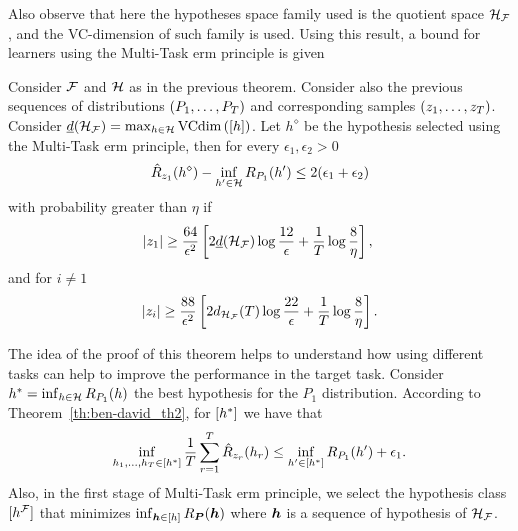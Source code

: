 Also observe that here the hypotheses space family used is the quotient space $\mathcal{H}_{\mathcal{F}}$, and the VC-dimension of such family is used.
%
Using this result, a bound for learners using the Multi-Task \acrshort{erm} principle is given~\cite[Theorem~3]{Ben-DavidB08}
\begin{theorem}\label{th:ben-david_th3}
    Consider $\mathcal{F}$ and $\mathcal{H}$ as in the previous theorem. Consider also the previous sequences of distributions $(P_1, \ldots, P_T)$ and corresponding samples $(z_1, \ldots, z_T)$. Consider $\underline{d}(\mathcal{H}_{\mathcal{F}}) = \max_{h \in \mathcal{H}} \text{VCdim}\left(\lbrack h\rbrack\right)$.
    Let $h^\diamond$ be the hypothesis selected using the Multi-Task \acrshort{erm} principle, then for every $\epsilon_1, \epsilon_2 > 0$
    \begin{equation}
        \nonumber
        {\hat{R}_{z_1}(h^\diamond) - \inf_{h' \in \mathcal{H}}R_{P_1}(h')}  \leq 2(\epsilon_1 + \epsilon_2)
    \end{equation}
    with probability greater than $\eta$ if
    \begin{equation}
        \label{eq:ben-david_th3_ineq1}
        \cardinal{\sample_1} \geq  \frac{64}{\epsilon^2} \left[2 \underline{d}(\hypspace_\frelset) \log \frac{12}{\epsilon} + \frac{1}{\ntasks}\log\frac{8}{\eta} \right], \; 
    \end{equation}
    and for $i \neq 1$
    \begin{equation}
        \label{eq:ben-david_th3_ineq2}
        \cardinal{\sample_i} \geq  \frac{88}{\epsilon^2} \left[2 d_{\hypspace_\frelset}(\ntasks) \log \frac{22}{\epsilon} + \frac{1}{\ntasks}\log\frac{8}{\eta} \right] .
    \end{equation}
\end{theorem}
The idea of the proof of this theorem helps to understand how using different tasks can help to improve the performance in the target task. 
Consider $h^* = \inf_{h \in \mathcal{H}} R_{P_1}(h)$ the best hypothesis for the $P_1$ distribution.
According to Theorem~\ref{th:ben-david_th2}, for $\lbrack h^*\rbrack$ we have that
\begin{equation}
    \nonumber
    {\inf_{h_1, \ldots, h_T\in \lbrack h^*\rbrack} \frac{1}{T} \sum_{r=1}^T\hat{R}_{z_r}(h_r) \leq \inf_{h' \in \lbrack h^*\rbrack}R_{P_1}(h')}  + \epsilon_1.
\end{equation}
%
Also, in the first stage of Multi-Task \acrshort{erm} principle, we select the hypothesis class $\lbrack h^{\mathcal{F}}\rbrack$ that minimizes $\inf_{\bm{h} \in \lbrack h\rbrack} R_{\bm{P}}(\bm{h})$ where $\bm{h}$ is a sequence of hypothesis of $\mathcal{H}_{\mathcal{F}}$.
